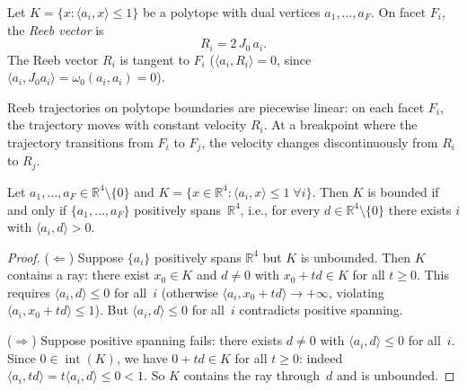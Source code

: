 \begin{unverified}
\begin{definition}\label{def:reeb-vector-field}
Let $K = \{x : \langle a_i, x \rangle \leq 1\}$ be a polytope
with dual vertices $a_1, \ldots, a_F$.
On facet $F_i$, the \emph{Reeb vector} is
\[
  R_i = 2\, J_0\, a_i.
\]
The Reeb vector $R_i$ is tangent to $F_i$
($\langle a_i, R_i \rangle = 0$, since
$\langle a_i, J_0 a_i \rangle = \omega_0(a_i, a_i) = 0$).
\end{definition}
\end{unverified}


\begin{unverified}
\begin{lemma}\label{lem:piecewise-linear-reeb}
Reeb trajectories on polytope boundaries are piecewise linear:
on each facet $F_i$, the trajectory moves with constant velocity $R_i$.
At a breakpoint where the trajectory transitions from $F_i$ to $F_j$,
the velocity changes discontinuously from $R_i$ to $R_j$.
\end{lemma}
\end{unverified}



\begin{unverified}
\begin{lemma}\label{lem:positive-span}
Let $a_1, \ldots, a_F \in \mathbb{R}^4 \setminus \{0\}$ and
$K = \{x \in \mathbb{R}^4 : \langle a_i, x \rangle \leq 1 \;\forall i\}$.
Then $K$ is bounded if and only if $\{a_1, \ldots, a_F\}$ positively
spans~$\mathbb{R}^4$, i.e., for every $d \in \mathbb{R}^4 \setminus \{0\}$
there exists $i$ with $\langle a_i, d \rangle > 0$.
\end{lemma}

\begin{proof}
($\Leftarrow$) Suppose $\{a_i\}$ positively spans $\mathbb{R}^4$ but $K$ is
unbounded. Then $K$ contains a ray: there exist $x_0 \in K$ and
$d \neq 0$ with $x_0 + t d \in K$ for all $t \geq 0$. This requires
$\langle a_i, d \rangle \leq 0$ for all~$i$ (otherwise
$\langle a_i, x_0 + td \rangle \to +\infty$, violating
$\langle a_i, x_0 + td \rangle \leq 1$). But $\langle a_i, d \rangle \leq 0$
for all~$i$ contradicts positive spanning. \contradiction

($\Rightarrow$) Suppose positive spanning fails: there exists
$d \neq 0$ with $\langle a_i, d \rangle \leq 0$ for all~$i$.
Since $0 \in \operatorname{int}(K)$, we have $0 + td \in K$ for all
$t \geq 0$: indeed $\langle a_i, td \rangle = t\langle a_i, d\rangle \leq 0 < 1$.
So $K$ contains the ray through~$d$ and is unbounded.
\end{proof}
\end{unverified}



